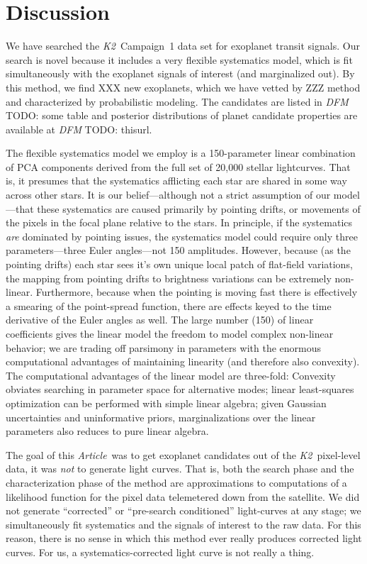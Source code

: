 \documentclass[12pt,preprint]{aastex}
\newcommand{\project}[1]{\textsl{#1}} %
\newcommand{\KT}{\project{K2}}
\newcommand{\paper}{\textsl{Article}}
\newcommand{\todo}[3]{{\color{#2} \emph{#1} TODO: #3}}
\newcommand{\dfmtodo}[1]{\todo{DFM}{red}{#1}}
\begin{document}
\section{Discussion}

We have searched the \KT\ Campaign~1 data set for exoplanet transit signals.
Our search is novel because it includes a very flexible systematics model,
which is fit simultaneously with the exoplanet signals of interest (and
marginalized out).
By this method, we find XXX new exoplanets, which we have vetted by ZZZ
method and characterized by probabilistic modeling.
The candidates are listed in \dfmtodo{some table} and
posterior distributions of planet candidate properties are available at
\dfmtodo{thisurl}.

The flexible systematics model we employ is a 150-parameter linear combination of PCA components
derived from the full set of 20,000 stellar lightcurves.
That is, it presumes that the systematics afflicting each star are shared in
some way across other stars.
It is our belief---although not a strict assumption of our model---that these
systematics are caused primarily by pointing drifts, or movements of the
pixels in the focal plane relative to the stars.
In principle, if the systematics \emph{are} dominated by pointing issues, the
systematics model could require only three parameters---three Euler
angles---not 150 amplitudes.
However, because (as the pointing drifts) each star sees it's own unique
local patch of flat-field variations, the mapping from pointing drifts to
brightness variations can be extremely non-linear.
Furthermore, because when the pointing is moving fast there is effectively
a smearing of the point-spread function, there are effects keyed to the
time derivative of the Euler angles as well.
The large number (150) of linear coefficients gives the linear model the
freedom to model complex non-linear behavior; we are trading off parsimony
in parameters with the enormous computational advantages of maintaining
linearity (and therefore also convexity).
The computational advantages of the linear model are three-fold:
Convexity obviates searching in parameter space for alternative modes;
linear least-squares optimization can be performed with simple linear algebra;
given Gaussian uncertainties and uninformative priors, marginalizations over
the linear parameters also reduces to pure linear algebra.

The goal of this \paper\ was to get exoplanet candidates out of the
\KT\ pixel-level data, it was \emph{not} to generate light curves.
That is, both the search phase and the characterization phase of the method
are approximations to computations of a likelihood function for the pixel
data telemetered down from the satellite.
We did not generate ``corrected'' or ``pre-search conditioned'' light-curves
at any stage; we simultaneously fit systematics and the signals of interest
to the raw data.
For this reason, there is no sense in which this method ever really
produces corrected light curves.
For us, a systematics-corrected light curve is not really a thing.
\end{document}
